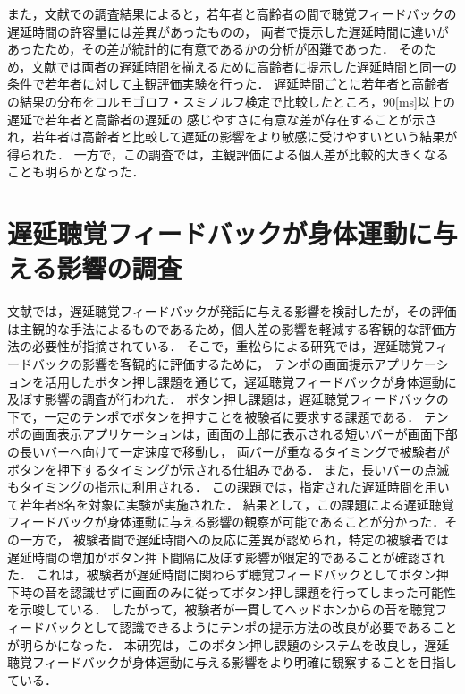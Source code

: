 また，文献\cite{shigematu-toukyoushibu}での調査結果によると，若年者と高齢者の間で聴覚フィードバックの遅延時間の許容量には差異があったものの，
両者で提示した遅延時間に違いがあったため，その差が統計的に有意であるかの分析が困難であった．
そのため，文献\cite{kayama}では両者の遅延時間を揃えるために高齢者に提示した遅延時間と同一の条件で若年者に対して主観評価実験を行った．
遅延時間ごとに若年者と高齢者の結果の分布をコルモゴロフ・スミノルフ検定で比較したところ，90[ms]以上の遅延で若年者と高齢者の遅延の
感じやすさに有意な差が存在することが示され，若年者は高齢者と比較して遅延の影響をより敏感に受けやすいという結果が得られた．
一方で，この調査では，主観評価による個人差が比較的大きくなることも明らかとなった．
\section{遅延聴覚フィードバックが身体運動に与える影響の調査}
文献\cite{kayama}では，遅延聴覚フィードバックが発話に与える影響を検討したが，その評価は主観的な手法によるものであるため，個人差の影響を軽減する客観的な評価方法の必要性が指摘されている．
そこで，重松らによる研究\cite{shigematu}では，遅延聴覚フィードバックの影響を客観的に評価するために，
テンポの画面提示アプリケーション\cite{Syuuronn-shigematu}を活用したボタン押し課題を通じて，遅延聴覚フィードバックが身体運動に及ぼす影響の調査が行われた．
ボタン押し課題は，遅延聴覚フィードバックの下で，一定のテンポでボタンを押すことを被験者に要求する課題である．
テンポの画面表示アプリケーションは，画面の上部に表示される短いバーが画面下部の長いバーへ向けて一定速度で移動し，
両バーが重なるタイミングで被験者がボタンを押下するタイミングが示される仕組みである．
また，長いバーの点滅もタイミングの指示に利用される．
この課題では，指定された遅延時間を用いて若年者8名を対象に実験が実施された．
結果として，この課題による遅延聴覚フィードバックが身体運動に与える影響の観察が可能であることが分かった．その一方で，
被験者間で遅延時間への反応に差異が認められ，特定の被験者では遅延時間の増加がボタン押下間隔に及ぼす影響が限定的であることが確認された．
これは，被験者が遅延時間に関わらず聴覚フィードバックとしてボタン押下時の音を認識せずに画面のみに従ってボタン押し課題を行ってしまった可能性を示唆している．
したがって，被験者が一貫してヘッドホンからの音を聴覚フィードバックとして認識できるようにテンポの提示方法の改良が必要であることが明らかになった．
本研究は，このボタン押し課題のシステムを改良し，遅延聴覚フィードバックが身体運動に与える影響をより明確に観察することを目指している．
